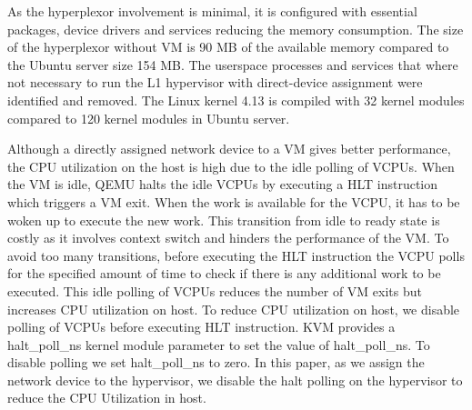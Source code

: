 As the hyperplexor involvement is minimal, it is configured with essential packages, device drivers and services reducing the memory consumption. The size of the hyperplexor without VM is 90 MB of the available memory compared to the Ubuntu server size 154 MB. The userspace processes and services that where not necessary to run the L1 hypervisor with direct-device assignment were identified and removed. The Linux kernel 4.13 is compiled with 32 kernel modules compared to 120 kernel modules in Ubuntu server. 
    

Although a directly assigned network device to a VM gives better performance, the CPU utilization on the host is high due to the idle polling of VCPUs. When the VM is idle, QEMU halts the idle VCPUs by executing a HLT instruction which triggers a VM exit. When the work is available for the VCPU, it has to be woken up to execute the new work. This transition from idle to ready state is costly as it involves context switch and hinders the performance of the VM. To avoid too many transitions, before executing the HLT instruction the VCPU polls for the specified amount of time to check if there is any additional work to be executed. This idle polling of VCPUs reduces the number of VM exits but increases CPU utilization on host. To reduce CPU utilization on host, we disable polling of VCPUs before executing HLT instruction. 
KVM provides a halt\_poll\_ns kernel module parameter to set the value of halt\_poll\_ns. To disable polling we set halt\_poll\_ns to zero. In this paper, as we assign the network device to the hypervisor, we disable the halt polling on the hypervisor to reduce the CPU Utilization in host.
    
